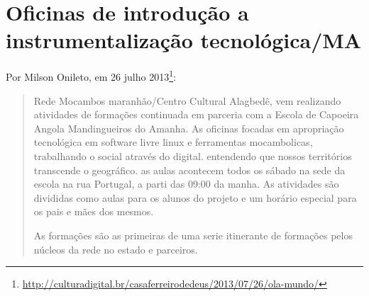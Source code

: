 \documentclass[a4paper, 11pt, oneside]{Relatorio_sem}  %
\begin{document}
\section{Oficinas de introdução a instrumentalização tecnológica/MA}
Por Milson Onileto, em 26 julho
2013\footnote{\url{http://culturadigital.br/casaferreirodedeus/2013/07/26/ola-mundo/}}:
\begin{quotation}
  Rede Mocambos maranhão/Centro Cultural Alagbedê, vem realizando
  atividades de formações continuada em parceria com a Escola de
  Capoeira Angola Mandingueiros do Amanha.  As oficinas focadas em
  apropriação tecnológica em software livre linux e ferramentas
  mocambolicas, trabalhando o social através do digital. entendendo
  que nossos territórios transcende o geográfico. as aulas acontecem
  todos os sábado na sede da escola na rua Portugal, a parti das 09:00
  da manha.  As atividades são divididas como aulas para os alunos do
  projeto e um horário especial para os pais e mães dos mesmos.
  
  As formações são as primeiras de uma serie itinerante de formações
  pelos núcleos da rede no estado e parceiros.
\end{quotation}
\end{document}
